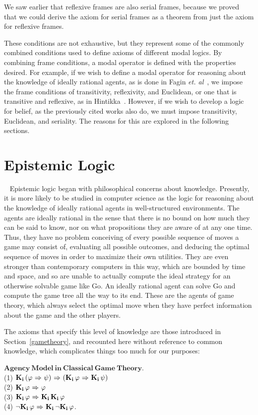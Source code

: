 We saw earlier that reflexive frames are also serial frames, because we proved that we could derive the axiom for serial frames as a theorem from just the axiom for reflexive frames.

These conditions are not exhaustive, but they represent some of the commonly combined conditions used to define axioms of different modal logics. By combining frame conditions, a modal operator is defined with the properties desired. For example, if we wish to define a modal operator for reasoning about the knowledge of ideally rational agents, as is done in Fagin \emph{et. al}~\cite{FHMV}, we impose the frame conditions of transitivity, reflexivity, and Euclidean, or one that is transitive and reflexive, as in Hintikka~\cite{Hintikka}. However, if we wish to develop a logic for belief, as the previously cited works also do, we must impose transitivity, Euclidean, and seriality. The reasons for this are explored in the following sections.

\section{Epistemic Logic}~\label{epistemic_logic}
Epistemic logic began with philosophical concerns about knowledge. Presently, it is more likely to be studied in computer science as the logic for reasoning about the knowledge of ideally rational agents in well-structured environments. The agents are ideally rational in the sense that there is no bound on how much they can be said to know, nor on what propositions they are aware of at any one time. Thus, they have no problem conceiving of every possible sequence of moves a game may consist of, evaluating all possible outcomes, and deducing the optimal sequence of moves in order to maximize their own utilities. They are even stronger than contemporary computers in this way, which are bounded by time and space, and so are unable to actually compute the ideal strategy for an otherwise solvable game like Go. An ideally rational agent can solve Go and compute the game tree all the way to its end. These are the agents of game theory, which always select the optimal move when they have perfect information about the game and the other players.

The axioms that specify this level of knowledge are those introduced in Section~\ref{gametheory}, and recounted here without reference to common knowledge, which complicates things too much for our purposes:

$\mathbf{Agency\  Model\  in\  Classical\  Game\  Theory}$.\\
(1) $\mathbf{K}_{\mathbf{i}}\,(\varphi {\ \Rightarrow \ } \psi) {\ \Rightarrow \ } (\mathbf{K}_{\mathbf{i}}\,\varphi {\ \Rightarrow \ } \mathbf{K}_{\mathbf{i}}\,\psi)$\\
(2) $\mathbf{K}_{\mathbf{i}}\,\varphi {\ \Rightarrow \ } \varphi$\\
(3) $\mathbf{K}_{\mathbf{i}}\,\varphi {\ \Rightarrow \ } \mathbf{K}_{\mathbf{i}}\,\mathbf{K}_{\mathbf{i}}\,\varphi$\\
(4) ${\neg} \mathbf{K}_{\mathbf{i}}\,\varphi {\ \Rightarrow \ } \mathbf{K}_{\mathbf{i}}\,{\neg}\mathbf{K}_{\mathbf{i}}\,\varphi$.

